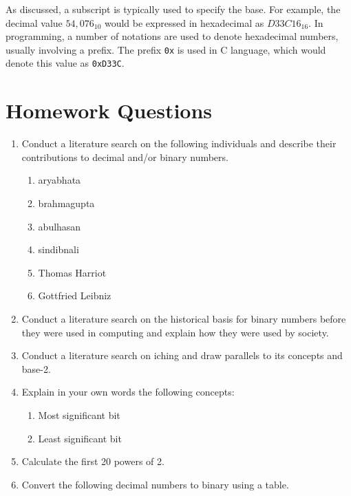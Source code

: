 As discussed, a subscript is typically used to specify the base. For example, the decimal value $54,076_{10}$
would be expressed in hexadecimal as $D33C16_{16}$. In programming, a number of notations are used to denote
hexadecimal numbers, usually involving a prefix. The prefix \texttt{0x} is used in C language, which would 
denote this value as \texttt{0xD33C}. 

\vfill\clearpage
\section*{Homework Questions}

\small
\begin{multicols*}{2}
   \begin{enumerate}[label=\thechapter.\arabic*]
    \item Conduct a literature search on the following individuals and describe their contributions to decimal and/or binary numbers.
        \begin{enumerate}
            \item \gls{aryabhata}
            \item \gls{brahmagupta}
            \item \gls{abulhasan}
            \item \gls{sindibnali}
            \item Thomas Harriot
            \item Gottfried Leibniz
        \end{enumerate}
    \item Conduct a literature search on the historical basis for binary numbers before they were used in %
    computing and explain how they were used by society.
    \item Conduct a literature search on \gls{iching} and draw parallels to its concepts and \gls{base-2}.
    \item Explain in your own words the following concepts:
    \begin{enumerate}
        \item Most significant bit
        \item Least significant bit
    \end{enumerate}
    \item Calculate the first 20 powers of 2.
    \item Convert the following decimal numbers to binary using a table.
    \begin{multicols*}{2}
        \begin{enumerate}

\end{enumerate}
\end{multicols*}
\end{enumerate}
\end{multicols*}

